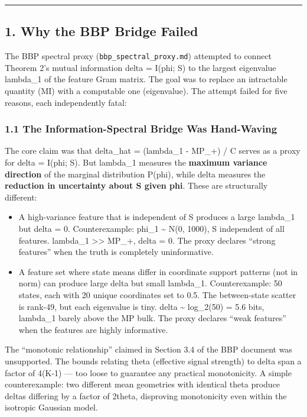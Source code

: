 \documentclass[
  12pt,
]{article}
\begin{document}
\begin{center}\rule{0.5\linewidth}{0.5pt}\end{center}

\subsection{1. Why the BBP Bridge
Failed}\label{why-the-bbp-bridge-failed}

The BBP spectral proxy (\texttt{bbp\_spectral\_proxy.md}) attempted to
connect Theorem 2's mutual information delta = I(phi; S) to the largest
eigenvalue lambda\_1 of the feature Gram matrix. The goal was to replace
an intractable quantity (MI) with a computable one (eigenvalue). The
attempt failed for five reasons, each independently fatal:

\subsubsection{1.1 The Information-Spectral Bridge Was
Hand-Waving}\label{the-information-spectral-bridge-was-hand-waving}

The core claim was that delta\_hat = (lambda\_1 - MP\_+) / C serves as a
proxy for delta = I(phi; S). But lambda\_1 measures the \textbf{maximum
variance direction} of the marginal distribution P(phi), while delta
measures the \textbf{reduction in uncertainty about S given phi}. These
are structurally different:

\begin{itemize}
\item
  A high-variance feature that is independent of S produces a large
  lambda\_1 but delta = 0. Counterexample: phi\_1 \textasciitilde{} N(0,
  1000), S independent of all features. lambda\_1
  \textgreater\textgreater{} MP\_+, delta = 0. The proxy declares
  ``strong features'' when the truth is completely uninformative.
\item
  A feature set where state means differ in coordinate support patterns
  (not in norm) can produce large delta but small lambda\_1.
  Counterexample: 50 states, each with 20 unique coordinates set to 0.5.
  The between-state scatter is rank-49, but each eigenvalue is tiny.
  delta \textasciitilde{} log\_2(50) = 5.6 bits, lambda\_1 barely above
  the MP bulk. The proxy declares ``weak features'' when the features
  are highly informative.
\end{itemize}

The ``monotonic relationship'' claimed in Section 3.4 of the BBP
document was unsupported. The bounds relating theta (effective signal
strength) to delta span a factor of 4(K-1) --- too loose to guarantee
any practical monotonicity. A simple counterexample: two different mean
geometries with identical theta produce deltas differing by a factor of
2theta, disproving monotonicity even within the isotropic Gaussian
model.
\end{document}
